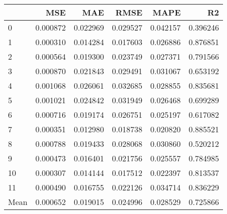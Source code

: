 \begin{tabular}{lrrrrr}
\toprule
 & MSE & MAE & RMSE & MAPE & R2 \\
\midrule
0 & 0.000872 & 0.022969 & 0.029527 & 0.042157 & 0.396246 \\
1 & 0.000310 & 0.014284 & 0.017603 & 0.026886 & 0.876851 \\
2 & 0.000564 & 0.019300 & 0.023749 & 0.027371 & 0.791566 \\
3 & 0.000870 & 0.021843 & 0.029491 & 0.031067 & 0.653192 \\
4 & 0.001068 & 0.026061 & 0.032685 & 0.028855 & 0.835681 \\
5 & 0.001021 & 0.024842 & 0.031949 & 0.026468 & 0.699289 \\
6 & 0.000716 & 0.019174 & 0.026751 & 0.025197 & 0.617082 \\
7 & 0.000351 & 0.012980 & 0.018738 & 0.020820 & 0.885521 \\
8 & 0.000788 & 0.019433 & 0.028068 & 0.030860 & 0.520212 \\
9 & 0.000473 & 0.016401 & 0.021756 & 0.025557 & 0.784985 \\
10 & 0.000307 & 0.014144 & 0.017512 & 0.022397 & 0.813537 \\
11 & 0.000490 & 0.016755 & 0.022126 & 0.034714 & 0.836229 \\
Mean & 0.000652 & 0.019015 & 0.024996 & 0.028529 & 0.725866 \\
\bottomrule
\end{tabular}
